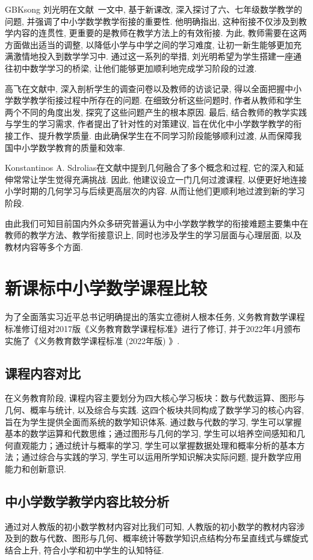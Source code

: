 \documentclass[a4paper,12pt,twoside]{ctexart}
\begin{document}
\begin{CJK*}{GBK}{song}
    刘光明在文献\cite{liu}~一文中, 基于新课改, 深入探讨了六、七年级数学教学的问题, 并强调了中小学数学教学衔接的重要性. 他明确指出, 这种衔接不仅涉及到教学内容的连贯性, 更重要的是教师在教学方法上的有效衔接. 为此, 教师需要在这两方面做出适当的调整, 以降低小学与中学之间的学习难度, 让初一新生能够更加充满激情地投入到数学学习中. 通过这一系列的举措, 刘光明希望为学生搭建一座通往初中数学学习的桥梁, 让他们能够更加顺利地完成学习阶段的过渡.

高飞在文献中\cite{gao}, 深入剖析学生的调查问卷以及教师的访谈记录, 得以全面把握中小学数学教学衔接过程中所存在的问题. 在细致分析这些问题时, 作者从教师和学生两个不同的角度出发, 探究了这些问题产生的根本原因. 最后, 结合教师的教学实践与学生的学习需求, 作者提出了针对性的对策建议,  旨在优化中小学数学教学的衔接工作、提升教学质量. 由此确保学生在不同学习阶段能够顺利过渡, 从而保障我国中小学数学教育的质量和效率.

Konstantinos A. Sdrolias在文献\cite{Kon}中提到几何融合了多个概念和过程,  它的深入和延伸常常让学生觉得充满挑战.  因此,  他建议设立一门几何过渡课程,  以便更好地连接小学时期的几何学习与后续更高层次的内容.  从而让他们更顺利地过渡到新的学习阶段.

由此我们可知目前国内外众多研究普遍认为中小学数学教学的衔接难题主要集中在教师的教学方法、教学衔接意识上, 同时也涉及学生的学习层面与心理层面, 以及教材内容等多个方面.

\section{新课标中小学数学课程比较}

为了全面落实习近平总书记明确提出的落实立德树人根本任务, 义务教育数学课程标准修订组对2017版《义务教育数学课程标准》进行了修订, 并于2022年4月颁布实施了《义务教育数学课程标准 (2022年版) 》.
\subsection{课程内容对比}

在义务教育阶段, 课程内容主要划分为四大核心学习板块：数与代数运算、图形与几何、概率与统计, 以及综合与实践\cite{zhong}. 这四个板块共同构成了数学学习的核心内容, 旨在为学生提供全面而系统的数学知识体系. 通过数与代数的学习, 学生可以掌握基本的数学运算和代数思维；通过图形与几何的学习, 学生可以培养空间感知和几何直观能力；通过统计与概率的学习, 学生可以掌握数据处理和概率分析的基本方法；通过综合与实践的学习, 学生可以运用所学知识解决实际问题, 提升数学应用能力和创新意识.

\subsection{中小学数学教学内容比较分析}
通过对人教版的初小数学教材内容对比我们可知, 人教版的初小数学的教材内容涉及到的数与代数、图形与几何、概率统计等数学知识点结构分布呈直线式与螺旋式结合上升, 符合小学和初中学生的认知特征.


\end{CJK*}
\end{document}
